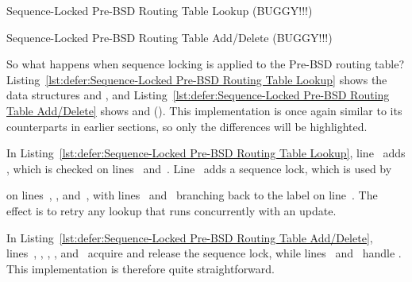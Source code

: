 \begin{listing}[tbp]

\caption{Sequence-Locked Pre-BSD Routing Table Lookup (BUGGY!!!)}
\label{lst:defer:Sequence-Locked Pre-BSD Routing Table Lookup}
\end{listing}

\begin{listing}[tbp]

\caption{Sequence-Locked Pre-BSD Routing Table Add\slash Delete (BUGGY!!!)}
\label{lst:defer:Sequence-Locked Pre-BSD Routing Table Add/Delete}
\end{listing}

So what happens when sequence locking is applied to the Pre-BSD
routing table?
Listing~\ref{lst:defer:Sequence-Locked Pre-BSD Routing Table Lookup}
shows the data structures and , and
Listing~\ref{lst:defer:Sequence-Locked Pre-BSD Routing Table Add/Delete}
shows  and  ().
This implementation is once again similar to its counterparts in earlier
sections, so only the differences will be highlighted.

\begin{fcvref}
In
Listing~\ref{lst:defer:Sequence-Locked Pre-BSD Routing Table Lookup},
line~ adds , which is checked on
lines~ and~.
Line~ adds a sequence lock, which is used by 
\end{fcvref}
\begin{fcvref}
on lines~, , and~,
with lines~ and~ branching back to
the  label on line~.
The effect is to retry any lookup that runs concurrently with an update.
\end{fcvref}

\begin{fcvref}
In
Listing~\ref{lst:defer:Sequence-Locked Pre-BSD Routing Table Add/Delete},
lines~, , ,
, and~
acquire and release the sequence lock,
while lines~ and~ handle .
This implementation is therefore quite straightforward.
\end{fcvref}

